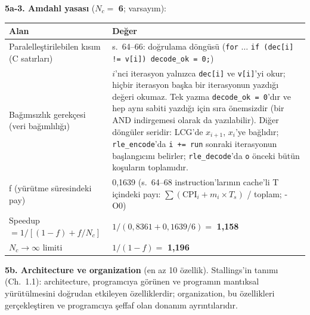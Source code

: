 \documentclass[11pt,a4paper]{article}
\newcommand{\tl}{\texttt}
\newcommand{\hd}[1]{\cellcolor{hdr}#1}
\begin{document}
\textbf{5a-3. Amdahl yasası} ($N_c = $ \textbf{6}; varsayım):

\begin{longtable}{|p{5.0cm}|p{10.5cm}|}
\hline
\hd{Alan} & \hd{Değer}\\
\hline
\endhead
Paralelleştirilebilen kısım (C satırları) & s.~64--66: doğrulama döngüsü (\tl{for} $\ldots$ \tl{if (dec[i] != v[i]) decode\_ok = 0;})\\ \hline
Bağımsızlık gerekçesi (veri bağımlılığı) & $i$'nci iterasyon yalnızca \tl{dec[i]} ve \tl{v[i]}'yi okur; hiçbir iterasyon başka bir iterasyonun yazdığı değeri okumaz. Tek yazma \tl{decode\_ok = 0}'dır ve hep aynı sabiti yazdığı için sıra önemsizdir (bir AND indirgemesi olarak da yazılabilir). Diğer döngüler seridir: LCG'de $x_{i+1}$, $x_i$'ye bağlıdır; \tl{rle\_encode}'da \tl{i += run} sonraki iterasyonun başlangıcını belirler; \tl{rle\_decode}'da \tl{o} önceki bütün koşuların toplamıdır.\\ \hline
f (yürütme süresindeki pay) & 0,1639 (s.~64--68 instruction'larının cache'li T içindeki payı: $\sum (\text{CPI}_i + m_i \times T_s)$ / toplam; -O0)\\ \hline
Speedup $= 1 / [(1 - f) + f / N_c]$ & $1 / (0{,}8361 + 0{,}1639/6) = $ \textbf{1,158}\\ \hline
$N_c \to \infty$ limiti & $1 / (1 - f) = $ \textbf{1,196}\\ \hline
\end{longtable}

\textbf{5b. Architecture ve organization} (en az 10 özellik). Stallings'in tanımı (Ch.~1.1):
architecture, programcıya görünen ve programın mantıksal yürütülmesini doğrudan etkileyen
özelliklerdir; organization, bu özellikleri gerçekleştiren ve programcıya şeffaf olan
donanım ayrıntılarıdır.
\end{document}
